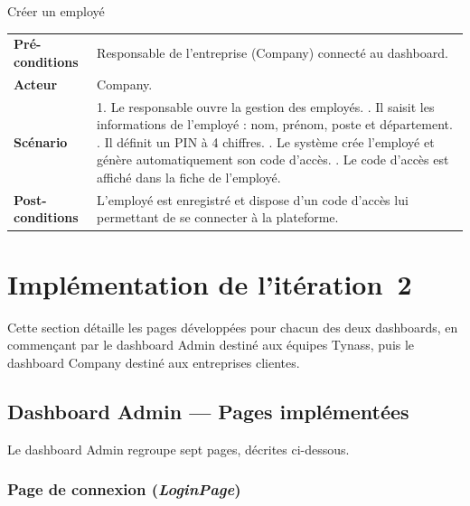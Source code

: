 \begin{ucbox}{Créer un employé}

  \begin{tabular}{lp{9cm}}

    \textbf{Pré-conditions} &
      Responsable de l'entreprise (Company) connecté au dashboard. \\

    \textbf{Acteur} &
      Company. \\

    \textbf{Scénario} &
      1. Le responsable ouvre la gestion des employés. \newline
      2. Il saisit les informations de l'employé : nom, prénom, poste et département. \newline
      3. Il définit un PIN à 4 chiffres. \newline
      4. Le système crée l'employé et génère automatiquement son code d'accès. \newline
      5. Le code d'accès est affiché dans la fiche de l'employé. \\

    \textbf{Post-conditions} &
      L'employé est enregistré et dispose d'un code d'accès lui permettant
      de se connecter à la plateforme. \\

  \end{tabular}

\end{ucbox}

\section{Implémentation de l'itération~2}

Cette section détaille les pages développées pour chacun des deux dashboards, en
commençant par le dashboard Admin destiné aux équipes Tynass, puis le dashboard Company
destiné aux entreprises clientes.

\subsection{Dashboard Admin --- Pages implémentées}

Le dashboard Admin regroupe sept pages, décrites ci-dessous.

\subsubsection{Page de connexion (\textit{LoginPage})}


